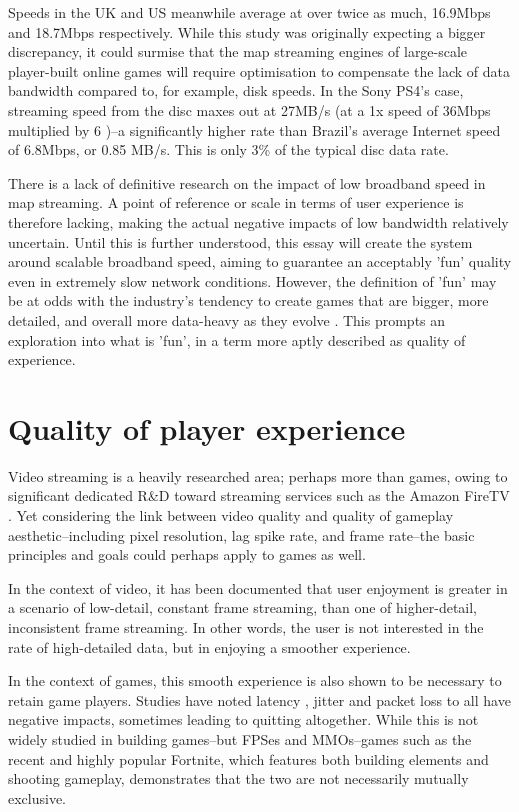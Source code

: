 \documentclass{scrartcl}
\begin{document}
Speeds in the UK and US meanwhile average at over twice as much, 16.9Mbps and 18.7Mbps respectively. While this study was originally expecting a bigger discrepancy, it could surmise that the map streaming engines of large-scale player-built online games will require optimisation to compensate the lack of data bandwidth compared to, for example, disk speeds. In the Sony PS4's case, streaming speed from the disc maxes out at 27MB/s (at a 1x speed of 36Mbps \cite{bluray} multiplied by 6 \cite{ps4specs})--a significantly higher rate than Brazil's average Internet speed of 6.8Mbps, or 0.85 MB/s. This is only 3\% of the typical disc data rate.

There is a lack of definitive research on the impact of low broadband speed in map streaming. A point of reference or scale in terms of user experience is therefore lacking, making the actual negative impacts of low bandwidth relatively uncertain. Until this is further understood, this essay will create the system around scalable broadband speed, aiming to guarantee an acceptably 'fun' quality even in extremely slow network conditions. However, the definition of 'fun' may be at odds with the industry's tendency to create games that are bigger, more detailed, and overall more data-heavy as they evolve \cite{graphicsvsexperience}. This prompts an exploration into what is 'fun', in a term more aptly described as quality of experience.

\section{Quality of player experience} \label{player}
Video streaming is a heavily researched area; perhaps more than games, owing to significant dedicated R\&D toward streaming services such as the Amazon FireTV \cite{amazonresearch}. Yet considering the link between video quality and quality of gameplay aesthetic--including pixel resolution, lag spike rate, and frame rate--the basic principles and goals could perhaps apply to games as well.

In the context of video, it has been documented \cite{qoelargestudy} that user enjoyment is greater in a scenario of low-detail, constant frame streaming, than one of higher-detail, inconsistent frame streaming. In other words, the user is not interested in the rate of high-detailed data, but in enjoying a smoother experience.

In the context of games, this smooth experience is also shown to be necessary to retain game players. Studies have noted latency \cite{qossensitivity} \cite{lagragequits}, jitter and packet loss \cite{lagragequits} to all have negative impacts, sometimes leading to quitting altogether. While this is not widely studied in building games--but FPSes and MMOs--games such as the recent and highly popular \cite{topgames} Fortnite, which features both building elements and shooting gameplay, demonstrates that the two are not necessarily mutually exclusive.
\end{document}
